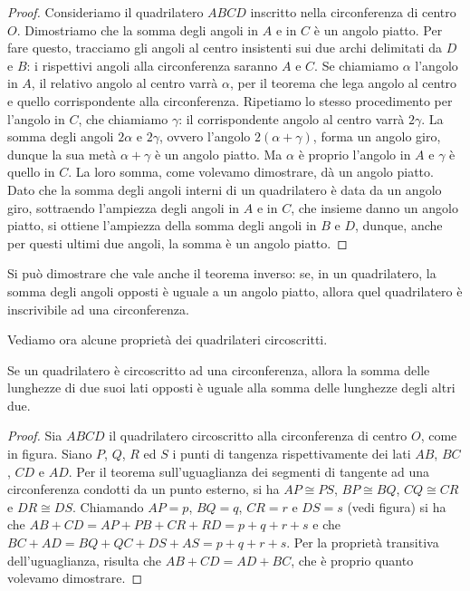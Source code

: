 \begin{proof}
Consideriamo il quadrilatero $ABCD$ inscritto nella circonferenza di 
centro $O$. Dimostriamo che la somma degli angoli in $A$ e in $C$ è 
un angolo piatto. Per fare questo, tracciamo gli angoli al centro 
insistenti sui due archi delimitati da $D$ e $B$: i rispettivi angoli 
alla circonferenza saranno $A$ e $C$. Se chiamiamo $\alpha$ l'angolo 
in $A$, il relativo angolo al centro varrà $\alpha$, per il teorema 
che lega angolo al centro e quello corrispondente alla circonferenza. 
Ripetiamo lo stesso procedimento per l'angolo in $C$, che chiamiamo 
$\gamma$: il corrispondente angolo al centro varrà $2\gamma$. La 
somma degli angoli $2\alpha$ e $2\gamma$, ovvero l'angolo 
$2(\alpha+\gamma)$, forma un angolo giro, dunque la sua metà 
$\alpha+\gamma$ è un angolo piatto. Ma $\alpha$ è proprio l'angolo in 
$A$ e $\gamma$ è quello in $C$. La loro somma, come volevamo 
dimostrare, dà un angolo piatto. Dato che la somma degli angoli 
interni di un quadrilatero è data da un angolo giro, sottraendo 
l'ampiezza degli angoli in $A$ e in $C$, che insieme danno un angolo 
piatto, si ottiene l'ampiezza della somma degli angoli in $B$ e $D$, 
dunque, anche per questi ultimi due angoli, la somma è un angolo 
piatto.
\end{proof}

Si può dimostrare che vale anche il teorema inverso: se, in un 
quadrilatero, la somma degli angoli opposti è uguale a un angolo 
piatto, allora quel quadrilatero è inscrivibile ad una circonferenza.

Vediamo ora alcune proprietà dei quadrilateri circoscritti.

\begin{teorema}\label{teo:6.6}
Se un quadrilatero è circoscritto ad una circonferenza, allora la 
somma delle lunghezze di due suoi lati opposti è uguale alla somma 
delle lunghezze degli altri due.
\end{teorema}


\begin{inaccessibleblock}
 \begin{figure}[htb]
  \centering
\end{figure}
\end{inaccessibleblock}

\begin{proof}
Sia $ABCD$ il quadrilatero circoscritto alla circonferenza di centro 
$O$, come in figura. Siano $P$, $Q$, $R$ ed $S$ i punti di tangenza 
rispettivamente dei lati $AB$, $BC$, $CD$ e $AD$. Per il teorema 
sull'uguaglianza dei segmenti di tangente ad una circonferenza 
condotti da un punto esterno, si ha $AP\cong PS$, $BP\cong BQ$, 
$CQ\cong CR$ e $DR\cong DS$. Chiamando $AP=p$, $BQ=q$, $CR=r$ e 
$DS=s$ (vedi figura) si ha che $AB+CD = AP+PB+CR+RD = p+q+r+s$ e che 
$BC+AD = BQ+QC+DS+AS = p+q+r+s$.
Per la proprietà transitiva dell'uguaglianza, risulta che 
$AB+CD=AD+BC$, che è proprio quanto volevamo dimostrare.
\end{proof}

